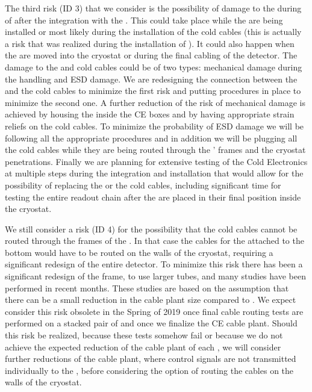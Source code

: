 The third risk (ID 3) that we consider is the possibility of damage to the 
 during of after the integration with the . This could
take place while the  are being installed or most likely during the
installation of the cold cables (this is actually a risk that was realized during
the installation of ). It could also happen when the  are
moved into the cryostat or during the final cabling of the detector. The damage
to the  and cold cables could be of two types: mechanical damage during the
handling and ESD damage. We are redesigning the connection between the 
and the cold cables to minimize the first risk and putting procedures in place
to minimize the second one. A further reduction of the risk of mechanical damage
is achieved by housing the  inside the CE boxes and by having 
appropriate strain reliefs on the cold cables. To minimize the probability of
ESD damage we will be following all the appropriate procedures and in addition
we will be plugging all the cold cables while they are being routed through the
' frames and the cryostat penetrations. Finally we are planning for
extensive testing of the Cold Electronics at multiple steps during the integration
and installation that would allow for the possibility of replacing the 
or the cold cables, including significant time for testing the entire readout 
chain after the  are placed in their final position inside the cryostat.

We still consider a risk (ID 4) for the possibility that the cold cables cannot
be routed through the frames of the . In that case the cables for the
 attached to the bottom  would have to be routed on the
walls of the cryostat, requiring a significant redesign of the entire detector. 
To minimize this risk there has been a significant redesign of the  frame, 
to use larger tubes, and many studies have been performed in recent months. 
These studies are based on the assumption that there can be a small reduction in
the cable plant size compared to . We expect consider this risk 
obsolete in the Spring of 2019 once final cable routing tests are performed on
a stacked pair of  and once we finalize the CE cable plant. Should
this risk be realized, because these tests somehow fail or because we do not 
achieve the expected reduction of the cable plant of each , we will 
consider further reductions of the cable plant, where control signals are not
transmitted individually to the , before considering the option of 
routing the cables on the walls of the cryostat.

